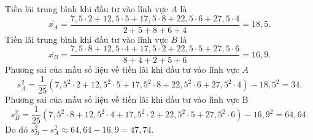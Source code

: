 \begin{ex}
{\begin{center}
\begin{tabular}{|c|c|c|c|c|c|}
				\hline
			\end{tabular}
		\end{center}
		Tiền lãi trung bình khi đầu tư vào lĩnh vực $A$ là
		$$
		\overline{x_A}=\dfrac{7{,}5\cdot 2+12{,}5\cdot 5+17{,}5\cdot 8+22{,}5 \cdot 6+27{,}5\cdot 4}{2+5+8+6+4}=18{,}5.$$
		Tiền lãi trung bình khi đầu tư vào lĩnh vực $B$ là
		$$\overline{x_B}=\dfrac{7{,}5\cdot 8+12{,}5\cdot 4+17{,}5\cdot 2+22{,}5\cdot 5+27{,}5\cdot 6}{8+4+2+5+6}=16{,}9.$$
		Phương sai của mẫu số liệu về tiền lãi khi đầu tư vào lĩnh vực $A$
		$$s_A^2=\dfrac{1}{25}\left(7{,}5^2 \cdot 2+12{,}5^2\cdot 5+17{,}5^2\cdot 8+22{,}5^2 \cdot 6+27{,}5^2 \cdot 4\right)-18{,}5^2=34.$$
		Phương sai của mẫu số liệu về tiền lãi khi đầu tư vào lĩnh vực B
		$$s_B^2=\dfrac{1}{25}\left(7{,}5^2\cdot 8+12{,}5^2\cdot 4+17{,}5^2\cdot 2+22{,}5^2\cdot 5+27{,}5^2\cdot 6\right)-16{,}9^2=64{,}64.$$
		Do đó $s_B^2-s_A^2 \approx 64{,}64-16{,}9=47{,}74$.
	}
\end{ex}

